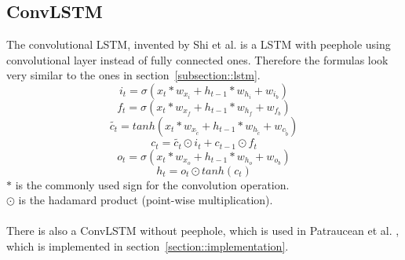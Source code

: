  \subsection{ConvLSTM} \label{subsection::convlstm}
  The convolutional LSTM, invented by Shi et al. \cite{Shi2015} is a LSTM with peephole using convolutional layer instead of fully connected ones.
  Therefore the formulas look very similar to the ones in section~\ref{subsection::lstm}.
  \begin{equation}
   i_t = \sigma(x_t \ast w_{x_i} + h_{t-1} \ast w_{h_i} + w_{i_b})
  \end{equation}
  \begin{equation}
   f_t = \sigma(x_t \ast w_{x_f} + h_{t-1} \ast w_{h_f} + w_{f_b})
  \end{equation}
  \begin{equation}
   \tilde{c_t} = tanh(x_t \ast w_{x_{\tilde{c}}} + h_{t-1} \ast w_{h_{\tilde{c}}} + w_{c_{\tilde{b}}})
  \end{equation}
  \begin{equation}
   c_t = \tilde{c_t} \odot i_t + c_{t-1} \odot f_t
  \end{equation}
  \begin{equation}
   o_t = \sigma(x_t \ast w_{x_o} + h_{t-1} \ast w_{h_o} + w_{o_b})
  \end{equation}
  \begin{equation}
   h_t = o_t \odot tanh(c_t)
  \end{equation}
  $\ast$ is the commonly used sign for the convolution operation.\\
  $\odot$ is the hadamard product (point-wise multiplication).\\\\
  There is also a ConvLSTM without peephole, which is used in Patraucean et al. \cite{Patraucean2015}, which is implemented in section~\ref{section::implementation}.
  
